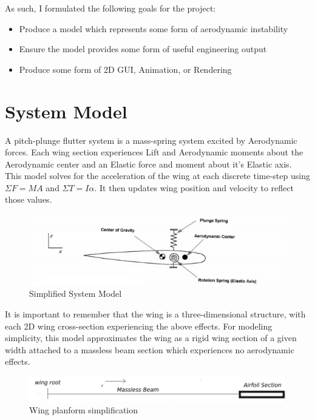 \documentclass[]{article}
\begin{document}
As such, I formulated the following goals for the project:

\begin{itemize}
	\item Produce a model which represents some form of aerodynamic instability
	\item Ensure the model provides some form of useful engineering output
	\item Produce some form of 2D GUI, Animation, or Rendering 
\end{itemize}

\section{System Model}

A pitch-plunge flutter system is a mass-spring system excited by Aerodynamic forces. Each wing section experiences Lift and Aerodynamic moments about the Aerodynamic center and an Elastic force and moment about it's Elastic axis. 
This model solves for the acceleration of the wing at each discrete time-step using $\Sigma F = MA$ and $\Sigma T = I \alpha$. It then updates wing position and velocity to reflect those values. 


\begin{figure}[H]
	\includegraphics[width=12cm]{MassSpring}
	\centering
	\caption{Simplified System Model\cite{article}}
\end{figure}

It is important to remember that the wing is a three-dimensional structure, with each 2D wing cross-section experiencing the above effects. For modeling simplicity, this model approximates the wing as a rigid wing section of a given width attached to a massless beam section which experiences no aerodynamic effects. 


\begin{figure}[H]
	\includegraphics[width=12cm]{ds}
	\centering
	\caption{Wing planform simplification}
\end{figure}
\end{document}
